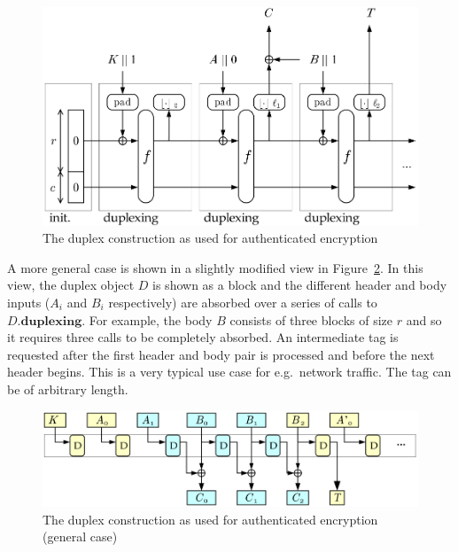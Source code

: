 \begin{figure}[ht]
\centering
\includegraphics[width=\textwidth]{img/DuplexAE.pdf}
\caption{The duplex construction as used for authenticated encryption \cite{Bertoni2010_DuplexingSlides}}
\label{fig:DuplexAE}
\end{figure}

A more general case is shown in a slightly modified view in Figure~\ref{fig:DuplexAE_Expanded}. 
In this view, the duplex object $D$ is shown as a block and the different header and body inputs ($A_i$ and $B_i$ respectively) are absorbed over a series of calls to $D.\mathbf{duplexing}$. 
For example, the body $B$ consists of three blocks of size $r$ and so it requires three calls to be completely absorbed.
An intermediate tag is requested after the first header and body pair is processed and before the next header begins.
This is a very typical use case for e.g.\ network traffic.
The tag can be of arbitrary length.

\begin{figure}[ht]
\centering
\includegraphics[width=\textwidth]{img/DuplexAE_Expanded.png}
\caption{The duplex construction as used for authenticated encryption (general case) \cite{Bertoni2010_DuplexingSlides}}
\label{fig:DuplexAE_Expanded}
\end{figure}

